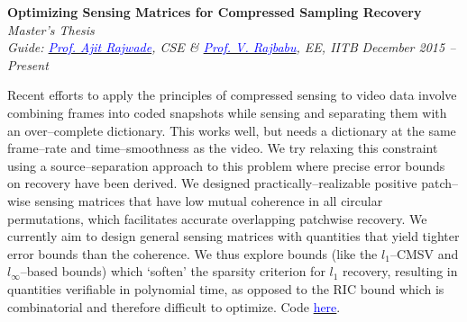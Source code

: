 \documentclass[margin,line]{res}
\newenvironment{list1}{
  \begin{list}{\ding{113}}{%
      \setlength{\itemsep}{0in}
      \setlength{\parsep}{0in} \setlength{\parskip}{0in}
      \setlength{\topsep}{0in} \setlength{\partopsep}{0in} 
      \setlength{\leftmargin}{0.17in}}}{\end{list}}
\begin{document}
\begin{resume}
{\bf Optimizing Sensing Matrices for Compressed Sampling Recovery} \hfill \textit{Master's Thesis} \\
{\em Guide: \href{https://www.cse.iitb.ac.in/~ajitvr}{\textcolor{blue}{Prof. Ajit Rajwade}}, CSE \& \href{https://www.ee.iitb.ac.in/wiki/faculty/rajbabu}{\textcolor{blue}{Prof. V. Rajbabu}}, EE, IITB} \hfill {\it December 2015 -- Present} \\
\vspace*{-.13in}
\begin{list1}
\item[]
Recent efforts to apply the principles of compressed sensing to video data involve combining frames into coded snapshots while sensing and separating them with an over--complete dictionary. This works well, but needs a dictionary at the same frame--rate and time--smoothness as the video. We try relaxing this constraint using a source--separation approach to this problem where precise error bounds on recovery have been derived. We designed practically--realizable positive patch--wise sensing matrices that have low mutual coherence in all circular permutations, which facilitates accurate overlapping patchwise recovery. We currently aim to design general sensing matrices with quantities that yield tighter error bounds than the coherence. We thus explore bounds (like the $l_1$--CMSV and $l_\infty$--based bounds) which `soften' the sparsity criterion for $l_1$ recovery, resulting in quantities verifiable in polynomial time, as opposed to the RIC bound which is combinatorial and therefore difficult to optimize. Code \href{https://bitbucket.org/alankarkotwal/coded-sourcesep}{\textcolor{blue} {here}}.
\end{list1}


\end{resume}
\end{document}
